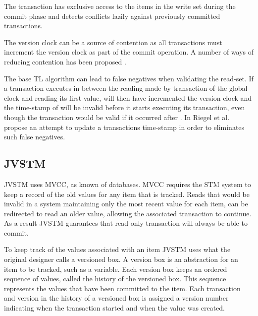 The transaction has exclusive access to the items in the write set during the commit phase and detects conflicts lazily against previously committed transactions. 

The version clock can be a source of contention as all transactions must increment the version clock as part of the commit operation\cite[p. 120]{harris2010transactional}. A number of ways of reducing contention has been proposed \cite{zhang2008commit}\cite{lev2009anatomy}\cite{avni2008maintaining}.

The base TL algorithm can lead to false negatives when validating the read-set. If a transaction  executes in between the reading made by transaction  of the global clock and reading its first value,  will then have incremented the version clock and the time-stamp of  will be invalid before it starts executing its transaction, even though the transaction would be valid if it occurred after . In \cite{riegel2007time} Riegel et al. propose an attempt to update a transactions time-stamp in order to eliminates such false negatives.

\subsection{JVSTM}
JVSTM uses \ac{MVCC}\cite[p. 1]{fernandes2011lock}, as known of databases\cite[p. 791]{elmasri2011fundamentals}. \ac{MVCC} requires the \ac{STM} system to keep a record of the old values for any item that is tracked\cite[p. 791]{elmasri2011fundamentals}. Reads that would be invalid in a system maintaining only the most recent value for each item, can be redirected to read an older value, allowing the associated transaction to continue\cite[p. 791]{elmasri2011fundamentals}. As a result JVSTM guarantees that read only transaction will always be able to commit\cite[p. 97]{cachopo2007development}.

To keep track of the values associated with an item JVSTM uses what the original designer calls a versioned box\cite[p. 63]{cachopo2007development}. A version box is an abstraction for an item to be tracked, such as a variable. Each version box keeps an ordered sequence of values, called the history of the versioned box. This sequence represents the values that have been committed to the item. Each transaction and version in the history of a versioned box is assigned a version number indicating when the transaction started and when the value was created.

